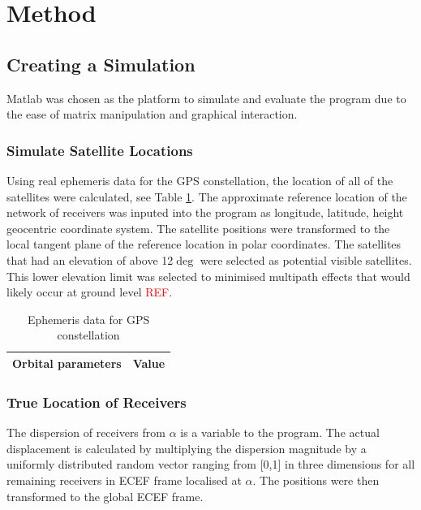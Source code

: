 
\section{Method}\label{sec:Method}

\subsection{Creating a Simulation}
Matlab was chosen as the platform to simulate and evaluate the program due to the ease of matrix manipulation and graphical interaction.
\subsubsection{Simulate Satellite Locations}
Using real ephemeris data for the GPS constellation, the location of all of the satellites were calculated, see Table \ref{Table: eph gps data}. The approximate reference location of the network of receivers was inputed into the program as longitude, latitude, height geocentric coordinate system. The satellite positions were transformed to the local tangent plane of the reference location in polar coordinates. The satellites that had an elevation of above 12$\deg$ were selected as potential visible satellites. This lower elevation limit was selected to minimised multipath effects that would likely occur at ground level \textcolor{red}{REF}. 
\begin{table}
\centering
\caption{Ephemeris data for GPS constellation}
\label{Table: eph gps data}
\begin{tabular}{|c|c|}
\hline
Orbital parameters & Value \\\hline
\end{tabular}
\end{table}

\subsubsection{True Location of Receivers}
The dispersion of receivers from $\alpha$ is a variable to the program. The actual displacement is calculated by multiplying the dispersion magnitude by a uniformly distributed random vector ranging from [0,1] in three dimensions for all remaining receivers in ECEF frame localised at $\alpha$. The positions were then transformed to the global ECEF frame.

